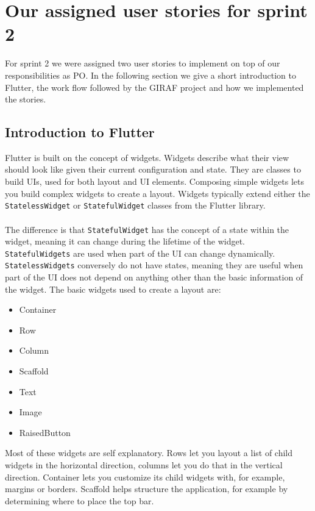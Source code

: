 \section{Our assigned user stories for sprint 2}
For sprint 2 we were assigned two user stories to implement on top of our responsibilities as PO.
In the following section we give a short introduction to Flutter, the work flow followed by the GIRAF project and how we implemented the stories.

\subsection{Introduction to Flutter}
Flutter is built on the concept of widgets.
Widgets describe what their view should look like given their current configuration and state\cite{Flutterwidget}. 
They are classes to build UIs, used for both layout and UI elements.
Composing simple widgets lets you build complex widgets to create a layout\cite{Flutterlayout}.
Widgets typically extend either the \texttt{StatelessWidget} or \texttt{StatefulWidget} classes from the Flutter library.
\\\\
The difference is that \texttt{StatefulWidget} has the concept of a state within the widget, meaning it can change during the lifetime of the widget.
\texttt{StatefulWidgets} are used when part of the UI can change dynamically.
\texttt{StatelessWidgets} conversely do not have states, meaning they are useful when part of the UI does not depend on anything other than the basic information of the widget. 
The basic widgets used to create a layout are\cite{FlutterBasicWidgets}:
 \begin{itemize}
    \item Container
    \item Row
    \item Column  
    \item Scaffold
    \item Text
    \item Image
    \item RaisedButton 
 \end{itemize} 
Most of these widgets are self explanatory. 
Rows let you layout a list of child widgets in the horizontal direction, columns let you do that in the vertical direction.
Container lets you customize its child widgets with, for example, margins or borders.
Scaffold helps structure the application, for example by determining where to place the top bar.

